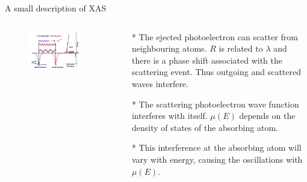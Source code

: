 \documentclass{beamer}
\begin{document}
  \begin{frame}{A small description of XAS}
  \begin{columns}
    \begin{column}{0.5\textwidth}
    	  \begin{figure}
    	    \centering
    	    \includegraphics[width=1.2\textwidth]{../Kuvat/absorption2.png}
    	  \end{figure}
    \end{column}
    
    \begin{column}{0.5\textwidth}
      \begin{itemize}
        \item[*] \footnotesize{The ejected photoelectron can scatter from neighbouring atoms. $R$ is related to $\lambda$ and there is a phase shift associated with the scattering event. Thus outgoing and scattered waves interfere.} 
        \item[*] \footnotesize{The scattering photoelectron wave function interferes with itself. $\mu(E)$ depends on the density of states of the absorbing atom.}
        \item[*] \footnotesize{This interference at the absorbing atom will vary with energy, causing the oscillations with $\mu(E)$.}
      \end{itemize}
    \end{column}
  \end{columns}
  \end{frame}
  
\end{document}
